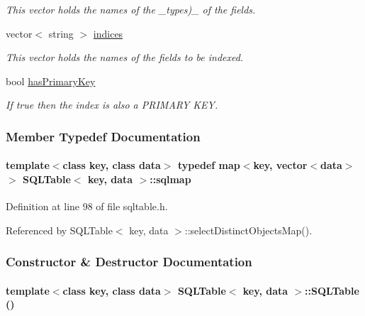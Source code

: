 \begin{CompactItemize}
\begin{CompactList}\small\item\em This vector holds the names of the \_\-types)\_\- of the fields.\item\end{CompactList}\item 
vector$<$ string $>$ \hyperlink{classSQLTable_SQLTableo7}{indices}
\begin{CompactList}\small\item\em This vector holds the names of the fields to be indexed.\item\end{CompactList}\item 
bool \hyperlink{classSQLTable_SQLTableo8}{has\-Primary\-Key}
\begin{CompactList}\small\item\em If true then the index is also a PRIMARY KEY.\item\end{CompactList}\end{CompactItemize}


\subsubsection{Member Typedef Documentation}
\hypertarget{classSQLTable_SQLTableu0}{
\paragraph[sqlmap]{\setlength{\rightskip}{0pt plus 5cm}template$<$class key, class data$>$ typedef map$<$key, vector$<$data$>$ $>$ SQLTable$<$ key, data $>$::sqlmap}\hfill}
\label{classSQLTable_SQLTableu0}




Definition at line 98 of file sqltable.h.

Referenced by SQLTable$<$ key, data $>$::select\-Distinct\-Objects\-Map().

\subsubsection{Constructor \& Destructor Documentation}
\hypertarget{classSQLTable_SQLTablea0}{
\paragraph[SQLTable]{\setlength{\rightskip}{0pt plus 5cm}template$<$class key, class data$>$ SQLTable$<$ key, data $>$::SQLTable ()}\hfill}
\label{classSQLTable_SQLTablea0}




